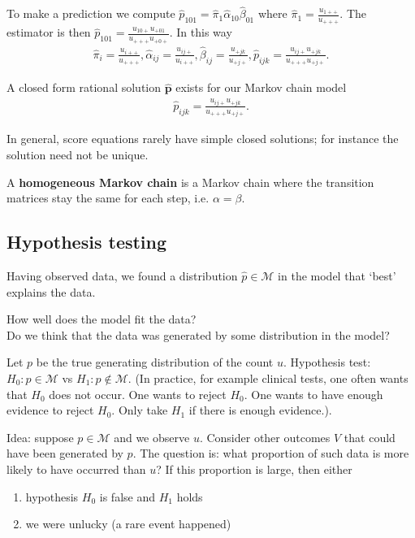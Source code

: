 \documentclass[a4paper, 11pt]{article}
\begin{document}
To make a prediction we compute \( \hat p_{101} = \hat \pi_1 \hat \alpha_{10} \hat \beta_{01} \) where \( \hat \pi_1 = \frac{u_{1++}}{u_{+++}} \). The estimator is then \( \hat p_{101} = \frac{u_{10+} u_{+01}}{u_{+++}u_{+0+}} \). In this way 
\begin{align*}
  \hat \pi_i = \frac{u_{i++}}{u_{+++}}, \hat \alpha_{ij} = \frac{u_{ij+}}{u_{i++}}, \hat \beta_{ij} = \frac{u_{+jk}}{u_{+j+}}, \hat p_{ijk} = \frac{u_{ij+} u_{+jk}}{u_{+++}u_{+j+}}.
\end{align*}

A closed form rational solution \( \hat{\mathbf p} \) exists for our Markov chain model 
\begin{align*}
  \hat p_{ijk} = \frac{u_{ij+} u_{+jk}}{u_{+++}u_{+j+}}.
\end{align*}

In general, score equations rarely have simple closed solutions; for instance the solution need not be unique.



\begin{defi}
  A \textbf{homogeneous Markov chain} is a Markov chain where the transition matrices stay the same for each step, i.e. \( \alpha = \beta \).
\end{defi}

\subsection{Hypothesis testing}
Having observed data, we found a distribution \( \hat p \in \mathcal{M} \) in the model that `best' explains the data. 

\begin{mdframed}
  How well does the model fit the data?\\
  Do we think that the data was generated by some distribution in the model?
\end{mdframed}

Let \( p \) be the true generating distribution of the count \( u \). Hypothesis test:  \(H_0: p \in \mathcal{M} \) vs \( H_1: p \notin \mathcal{M} \). (In practice, for example clinical tests, one often wants that \( H_0 \) does not occur. One wants to reject \( H_0 \). One wants to have enough evidence to reject \( H_0 \). Only take \( H_1 \) if there is enough evidence.). 

Idea: suppose \( p \in \mathcal{M} \) and we observe \( u \). Consider other outcomes \( V \) that could have been generated by \( p \). The question is: what proportion of such data is more likely to have occurred than \( u \)? If this proportion is large, then either
\begin{enumerate}
  \item hypothesis \( H_0 \) is false and \( H_1 \) holds 
  \item we were unlucky (a rare event happened)
\end{enumerate}
\end{document}
